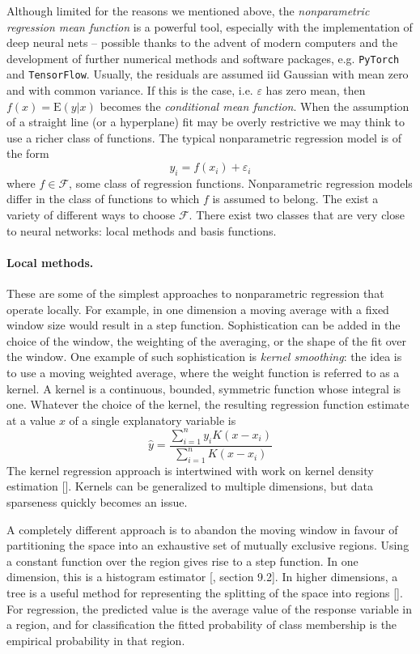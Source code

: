 \bigbreak

Although limited for the reasons we mentioned above, the \textit{nonparametric regression mean function} is a powerful tool, especially with the implementation of deep neural nets -- possible thanks to the advent of modern computers and the development of further numerical methods and software packages, e.g. \texttt{PyTorch} and \texttt{TensorFlow}. Usually, the residuals are assumed iid Gaussian with mean zero and with common variance. If this is the case, i.e. $\varepsilon$ has zero mean, then $f(x) = \mathrm{E}(y|x)$ becomes the \textit{conditional mean function}. When the assumption of a straight line (or a hyperplane) fit may be overly restrictive we may think to use a richer class of functions. The typical nonparametric regression model is of the form
$$y_i = f(x_i) + \varepsilon_i$$
where $f\in\mathcal{F}$, some class of regression functions. Nonparametric regression models differ in the class of functions to which $f$ is assumed to belong. The exist a variety of different ways to choose $\mathcal{F}$. There exist two classes that are very close to neural networks: local methods and basis functions.

\paragraph{Local methods.} These are some of the simplest approaches to nonparametric regression that operate locally. For example, in one dimension a moving average with a fixed window size would result in a step function. Sophistication can be added in the choice of the window, the weighting of the averaging, or the shape of the fit over the window. One example of such sophistication is \textit{kernel smoothing}: the idea is to use a moving weighted average, where the weight function is referred to as a kernel. A kernel is a continuous, bounded, symmetric function whose integral is one. Whatever the choice of the kernel, the resulting regression function estimate at a value $x$ of a single explanatory variable is 
$$\hat{y} = \frac{\sum_{i=1}^{n} y_i K(x-x_i)}{\sum_{i=1}^{n} K(x-x_i)}$$
The kernel regression approach is intertwined with work on kernel density estimation [\cite{Silverman1986, Loader2006}]. Kernels can be generalized to multiple dimensions, but data sparseness quickly becomes an issue. 

A completely different approach is to abandon the moving window in favour of partitioning the space into an exhaustive set of mutually exclusive regions. Using a constant function over the region gives rise to a step function. In one dimension, this is a histogram estimator [\cite{Gentle2002}, section 9.2]. In higher dimensions, a tree is a useful method for representing the splitting of the space into regions [\cite{Breiman1984}]. For regression, the predicted value is the average value of the response variable in a region, and for classification the fitted probability of class membership is the empirical probability in that region. 


